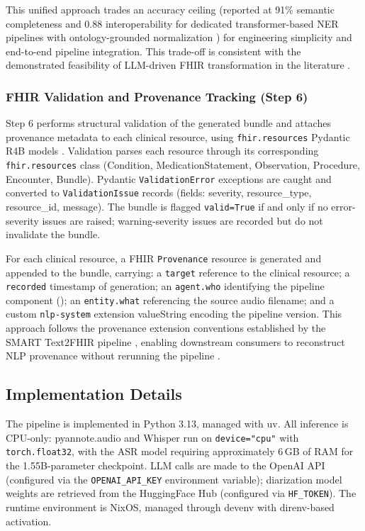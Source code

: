 This unified approach trades an accuracy ceiling (reported at 91\% semantic completeness and 0.88 interoperability for dedicated transformer-based NER pipelines with ontology-grounded normalization \cite{brens2025semantic}) for engineering simplicity and end-to-end pipeline integration. This trade-off is consistent with the demonstrated feasibility of LLM-driven FHIR transformation in the literature \cite{hong2020nlp2fhir, li2024fhirgpt}.

\subsubsection{FHIR Validation and Provenance Tracking (Step 6)}

Step 6 performs structural validation of the generated bundle and attaches provenance metadata to each clinical resource, using \texttt{fhir.resources} Pydantic R4B models \cite{hl7fhir2022r4b}. Validation parses each resource through its corresponding \texttt{fhir.resources} class (Condition, MedicationStatement, Observation, Procedure, Encounter, Bundle). Pydantic \texttt{ValidationError} exceptions are caught and converted to \texttt{ValidationIssue} records (fields: severity, resource\_type, resource\_id, message). The bundle is flagged \texttt{valid=True} if and only if no error-severity issues are raised; warning-severity issues are recorded but do not invalidate the bundle.

For each clinical resource, a FHIR \texttt{Provenance} resource is generated and appended to the bundle, carrying: a \texttt{target} reference to the clinical resource; a \texttt{recorded} timestamp of generation; an \texttt{agent.who} identifying the pipeline component (); an \texttt{entity.what} referencing the source audio filename; and a custom \texttt{nlp-system} extension valueString encoding the pipeline version. This approach follows the provenance extension conventions established by the SMART Text2FHIR pipeline \cite{miller2023smart}, enabling downstream consumers to reconstruct NLP provenance without rerunning the pipeline \cite{frei2025inferno}.

\subsection{Implementation Details}

The pipeline is implemented in Python 3.13, managed with uv. All inference is CPU-only: pyannote.audio and Whisper run on \texttt{device="cpu"} with \texttt{torch.float32}, with the ASR model requiring approximately 6\,GB of RAM for the 1.55B-parameter checkpoint. LLM calls are made to the OpenAI API (configured via the \texttt{OPENAI\_API\_KEY} environment variable); diarization model weights are retrieved from the HuggingFace Hub (configured via \texttt{HF\_TOKEN}). The runtime environment is NixOS, managed through devenv with direnv-based activation.
